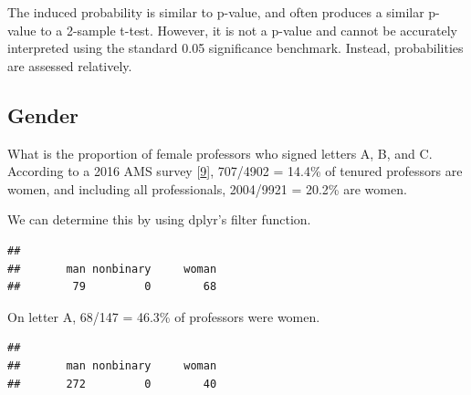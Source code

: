 \documentclass[]{article}
\newenvironment{Shaded}{\begin{snugshade}}{\end{snugshade}}
\newcommand{\CommentTok}[1]{\textcolor[rgb]{0.56,0.35,0.01}{\textit{#1}}}
\newcommand{\KeywordTok}[1]{\textcolor[rgb]{0.13,0.29,0.53}{\textbf{#1}}}
\newcommand{\NormalTok}[1]{#1}
\newcommand{\OperatorTok}[1]{\textcolor[rgb]{0.81,0.36,0.00}{\textbf{#1}}}
\newcommand{\StringTok}[1]{\textcolor[rgb]{0.31,0.60,0.02}{#1}}
\begin{document}
The induced probability is similar to p-value, and often produces a
similar p-value to a 2-sample t-test. However, it is not a p-value and
cannot be accurately interpreted using the standard 0.05 significance
benchmark. Instead, probabilities are assessed relatively.

\hypertarget{gender}{%
\subsection{Gender}\label{gender}}

What is the proportion of female professors who signed letters A, B, and
C. According to a 2016 AMS survey
{[}\protect\hyperlink{Bibliography}{9}{]}, 707/4902 = 14.4\% of tenured
professors are women, and including all professionals, 2004/9921 =
20.2\% are women.

We can determine this by using dplyr's filter function.

\begin{Shaded}
\end{Shaded}

\begin{verbatim}
## 
##       man nonbinary     woman 
##        79         0        68
\end{verbatim}

On letter A, 68/147 = 46.3\% of professors were women.

\begin{Shaded}
\end{Shaded}

\begin{verbatim}
## 
##       man nonbinary     woman 
##       272         0        40
\end{verbatim}
\end{document}
